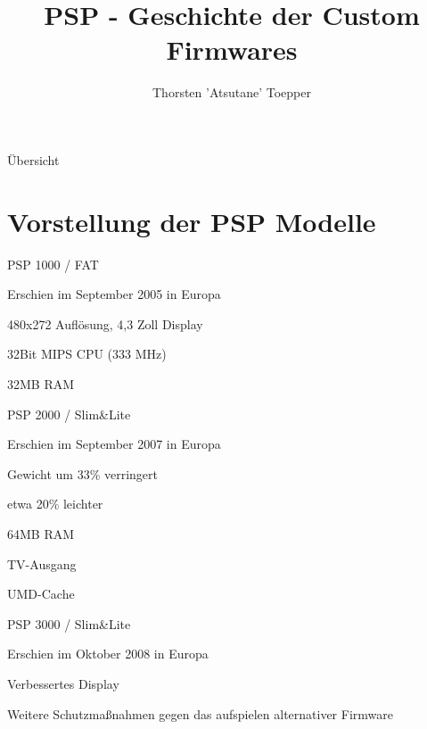 \documentclass[mode=print,paper=screen,size=10pt,style=paintings]{powerdot}
\author{Thorsten 'Atsutane' Toepper}
\title{PSP - Geschichte der Custom Firmwares}
\newcommand{\Anf}[1]{\glqq #1\grqq}
\begin{document}
\maketitle
\begin{slide}{Übersicht}
  \tableofcontents[content=sections]
\end{slide}


\section{Vorstellung der PSP Modelle}
\begin{slide}{PSP 1000 / FAT}
	\begin{list}{-}{}
		\item{Erschien im September 2005 in Europa}
		\item{480x272 Auflösung, 4,3 Zoll Display}
		\item{32Bit MIPS CPU (333 MHz)}
		\item{32MB RAM}
	\end{list}
\end{slide}

\begin{slide}{PSP 2000 / Slim\&Lite}
	\begin{list}{-}{}
		\item{Erschien im September 2007 in Europa}
		\item{Gewicht um 33\% verringert}
		\item{etwa 20\% leichter}
		\item{64MB RAM}
		\item{TV-Ausgang}
		\item{UMD-Cache}
	\end{list}
\end{slide}

\begin{slide}{PSP 3000 / Slim\&Lite}
	\begin{list}{-}{}
		\item{Erschien im Oktober 2008 in Europa}
		\item{\Anf{Verbessertes} Display}
		\item{Weitere Schutzmaßnahmen gegen das aufspielen alternativer Firmware}
	\end{list}
\end{slide}
\end{document}
